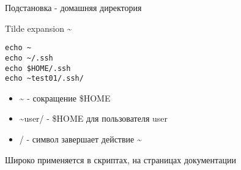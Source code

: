 \begin{frame}[fragile]{Подстановка - домашняя директория}

    Tilde expansion \alert{\textasciitilde{}}
\begin{lstlisting}
echo ~
echo ~/.ssh
echo $HOME/.ssh
echo ~test01/.ssh/
\end{lstlisting}

\pause
\begin{itemize}
    \item \textasciitilde{} - сокращение \$HOME 
    \item \textasciitilde{}user/ - \$HOME для пользователя user
    \item / - символ завершает действие \textasciitilde{} 
\end{itemize}

Широко применяется в скриптах, на страницах документации
    
\end{frame}
